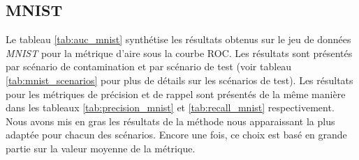 \subsection{MNIST}

Le tableau \ref{tab:auc_mnist} synthétise les résultats obtenus sur le jeu de données \textit{MNIST} pour la métrique d'aire sous la courbe ROC. Les résultats sont présentés par scénario de contamination et par scénario de test (voir tableau \ref{tab:mnist_scenarios} pour plus de détails sur les scénarios de test). Les résultats pour les métriques de précision et de rappel sont présentés de la même manière dans les tableaux \ref{tab:precision_mnist} et \ref{tab:recall_mnist} respectivement. Nous avons mis en gras les résultats de la méthode nous apparaissant la plus adaptée pour chacun des scénarios. Encore une fois, ce choix est basé en grande partie sur la valeur moyenne de la métrique.

